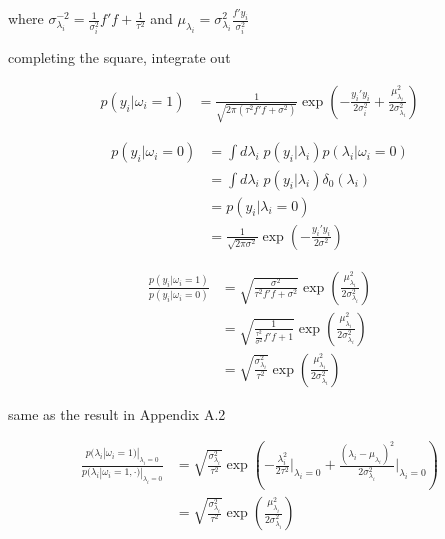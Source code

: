where $\sigma_{\lambda_i}^{-2} = \frac{1}{\sigma_i^2}f'f + \frac{1}{\tau^2}$ and $\mu_{\lambda_i} = \sigma_{\lambda_i}^2 \frac{f'y_i}{\sigma_i^2}$

completing the square, integrate out

\begin{align}
p(y_i|\omega_i=1) &= \frac{1}{\sqrt{2\pi(\tau^2 f'f + \sigma^2)}}\exp{\left(-\frac{y_i'y_i}{2\sigma_i^2} + \frac{\mu_{\lambda_i}^2}{2\sigma_{\lambda_i}^2}\right)}
\end{align}

\begin{align}
p(y_i|\omega_i=0) &= \int d\lambda_i\;p(y_i|\lambda_i) p(\lambda_i|\omega_i=0) \\
&= \int d\lambda_i\;p(y_i|\lambda_i) \delta_0(\lambda_i) \\
&= p(y_i|\lambda_i=0) \\
&= \frac{1}{\sqrt{2\pi\sigma^2}}\exp{\left(-\frac{y_i'y_i}{2\sigma^2}\right)}
\end{align}

\begin{align}
\frac{p(y_i|\omega_i=1)}{p(y_i|\omega_i=0)} &= \sqrt{\frac{\sigma^2}{\tau^2 f'f + \sigma^2}}\exp{\left( \frac{\mu_{\lambda_i}^2}{2\sigma_{\lambda_i}^2}\right)} \\
&= \sqrt{\frac{1}{\frac{\tau^2}{\sigma^2} f'f + 1}}\exp{\left( \frac{\mu_{\lambda_i}^2}{2\sigma_{\lambda_i}^2}\right)} \\
&=\sqrt{\frac{\sigma_{\lambda_i}^2}{\tau^2}}\exp{\left( \frac{\mu_{\lambda_i}^2}{2\sigma_{\lambda_i}^2}\right)}
\end{align}

same as the \citet{KaufmannSchumacher2017} result in Appendix A.2

\begin{align}
\frac{p(\lambda_i|\omega_i=1)|_{\lambda_i=0}}{p(\lambda_i|\omega_i=1, \cdot)|_{\lambda_i=0}} 
&= \sqrt{\frac{\sigma_{\lambda_i}^2}{\tau^2}} \exp{\left(-\frac{\lambda_i^2}{2\tau^2}\vert_{\lambda_i=0} + \frac{(\lambda_i-\mu_{\lambda_i})^2}{2\sigma_{\lambda_i}^2}\vert_{\lambda_i=0}\right)} \\
&=\sqrt{\frac{\sigma_{\lambda_i}^2}{\tau^2}}\exp{\left( \frac{\mu_{\lambda_i}^2}{2\sigma_{\lambda_i}^2}\right)}
\end{align}
